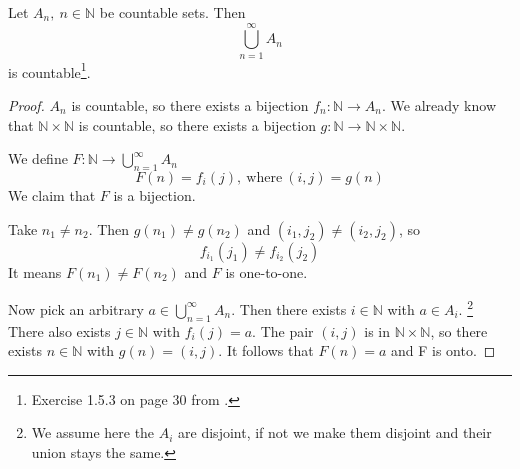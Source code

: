 \begin{thm}
Let $A_n, ~n \in \mathbb{N}$ be countable sets. Then 
$$
\bigcup_{n=1}^\infty A_n
$$ 
is countable\footnote{Exercise 1.5.3 on page 30 from .}.
\end{thm}

\begin{proof}
$A_n$ is countable, so there exists a bijection $f_n:\mathbb{N} \rightarrow A_n$. We already know that $\mathbb{N} \times \mathbb{N}$ is countable, so there exists a bijection $g:\mathbb{N} \rightarrow \mathbb{N} \times \mathbb{N}$.

We define $F:\mathbb{N} \rightarrow \bigcup_{n=1}^\infty A_n$
$$
F(n) = f_i(j), ~\text{where}~ (i, j) = g(n)
$$
We claim that $F$ is a bijection.

Take $n_1 \ne n_2$. Then $g(n_1) \ne g(n_2)$ and $(i_1, j_2) \ne (i_2, j_2)$, so 
$$
f_{i_1}(j_1) \ne f_{i_2}(j_2)
$$
It means $F(n_1) \ne F(n_2)$ and $F$ is one-to-one.

Now pick an arbitrary $a \in \bigcup_{n=1}^\infty A_n$. Then there exists $i \in \mathbb{N}$ with $a \in A_i$. \footnote{We assume here the $A_i$ are disjoint, if not we make them disjoint and their union stays the same.} There also exists $j \in \mathbb{N}$ with $f_i(j) = a$. The pair $(i, j)$ is in
$\mathbb{N} \times \mathbb{N}$, so there exists $n \in \mathbb{N}$ with $g(n)=(i, j)$. It follows that $F(n)=a$ and F is onto. 
\end{proof}
